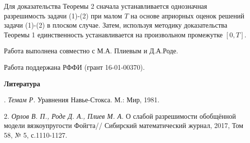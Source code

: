 Для доказательства Теоремы 2 сначала устанавливается однозначная разрешимость задачи  (1)-(2) при малом  $T$  на основе априорных оценок решений задачи  (1)-(2) в плоском случае. Затем, используя методику доказательства  Теоремы 1 единственность  устанавливается на произвольном промежутке $[0,T]$.



Работа выполнена совместно с М.А. Плиевым и Д.А.Роде.

Работа поддержана  РФФИ (грант 16-01-00370).

\smallskip \centerline{\bf Литература}. {\it Темам Р.}  Уравнения Навье-Стокса. М.: Мир,  1981.

2. {\it Орлов В. П.,  Роде Д. А., Плиев М. А.} О слабой разрешимости обобщённой
модели вязкоупругости  Фойгта// Сибирский математический журнал, 2017, Том 58, № 5, с.1110-1127.
